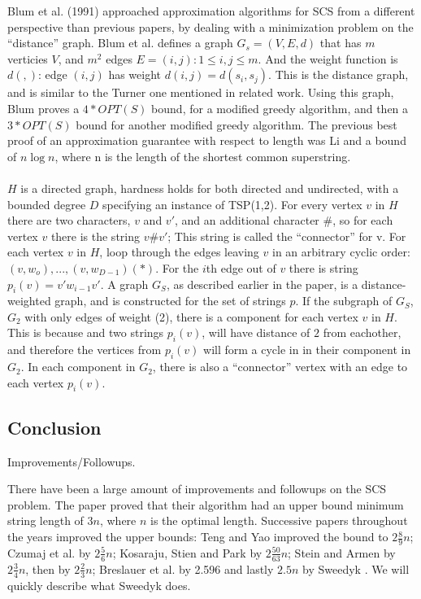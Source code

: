 \documentclass[letterpaper,11pt,titlepage]{article}
\begin{document}
Blum et al. (1991) approached approximation algorithms for SCS from a different perspective than previous papers, by dealing with a minimization problem on the ``distance'' graph.  Blum et al. defines a graph $G_s = (V, E, d)$ that has $m$ verticies $V$, and $m^2$ edges $E = {(i,j): 1 \leq i, j \leq m}$.  And the weight function is $d(,)$: edge $(i,j)$ has weight $d(i,j) = d(s_i, s_j)$.  This is the distance graph, and is similar to the Turner one mentioned in related work.  Using this graph, Blum proves a $4*OPT(S)$ bound, for a modified greedy algorithm, and then a $3*OPT(S)$ bound for another modified greedy algorithm.  The previous best proof of an approximation guarantee with respect to length was Li and a bound of $n\log n$, where n is the length of the shortest common superstring.  \\ \\

$H$ is a directed graph, hardness holds for both directed and undirected, with a bounded degree $D$ specifying an instance of TSP(1,2).  For every vertex $v$ in $H$ there are two characters, $v$ and $v'$, and an additional character $\#$, so for each vertex $v$ there is the string $v\#v'$; This string is called the ``connector'' for v.  For each vertex $v$ in $H$, loop through the edges leaving $v$ in an arbitrary cyclic order: $(v, w_o),...,(v,w_{D-1})(*)$.  For the $i$th edge out of $v$ there is string $p_i(v) = v'w_{i-1}v'$.  A graph $G_S$, as described earlier in the paper, is a distance-weighted graph, and is constructed for the set of strings $p$.  If the subgraph of $G_S$, $G_2$ with only edges of weight (2), there is a component for each vertex $v$ in $H$.  This is because and two strings $p_i(v)$, will have distance of $2$ from eachother, and therefore the vertices from $p_i(v)$ will form a cycle in in their component in $G_2$.  In each component in $G_2$, there is also a ``connector'' vertex with an edge to each vertex $p_i(v)$.  






\subsection{Conclusion}

Improvements/Followups.


There have been a large amount of improvements and followups on the SCS problem. The paper proved that their algorithm had an upper bound minimum string length of $3n$, where $n$ is the optimal length. Successive papers throughout the years improved the upper bounds: Teng and Yao improved the bound to $2 \frac{8}{9} n$; Czumaj et al. by $2 \frac{5}{6} n$; Kosaraju, Stien and Park by $2 \frac{50}{63} n$; Stein and Armen by $2 \frac{3}{4} n$, then by $2 \frac{2}{3} n$; Breslauer et al. by 2.596 and lastly $2.5 n$ by Sweedyk \cite{sweedyk2000boldmath}. We will quickly describe what Sweedyk does.\\
\end{document}
